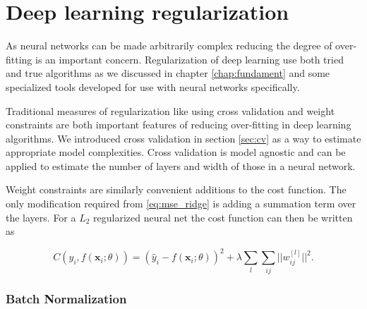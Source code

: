 \section{Deep learning regularization}

As neural networks can be made arbitrarily complex reducing the degree of over-fitting is an important concern. Regularization of deep learning use both tried and true algorithms as we discussed in chapter \ref{chap:fundament} and some specialized tools developed for use with neural networks specifically. 

Traditional measures of regularization like using cross validation and weight constraints are both important features of reducing over-fitting in deep learning algorithms. We introduced cross validation in section \ref{sec:cv} as a way to estimate appropriate model complexities. Cross validation is model agnostic and can be applied to estimate the number of layers and width of those in a neural network. 

Weight constraints are similarly convenient additions to the cost function. The only modification required from \ref{eq:mse_ridge} is adding a summation term over the layers. For a $L_2$ regularized neural net the cost function can then be written as 

\begin{equation}
C(\hat{y}_i, f(\mathbf{x}_i; \theta)) = (\hat{y}_i - f(\mathbf{x}_i; \theta))^2 + \lambda\sum_l\sum_{ij}||w_{ij}^{[l]}||^2.
\end{equation}



\subsubsection{Batch Normalization}\label{sec:batchnorm}
